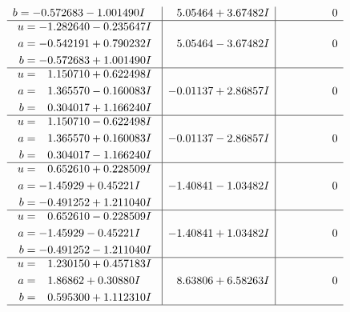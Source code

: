 \documentclass[1p]{elsarticle_modified}
\theoremstyle{definition}
\begin{document}
$$\begin{array}{c|c|c}
\begin{aligned}
b &= -0.572683 - 1.001490 I\end{aligned}
 & \phantom{-}5.05464 + 3.67482 I & \phantom{-0.000000 } 0 \\ \hline\begin{aligned}
u &= -1.282640 - 0.235647 I \\
a &= -0.542191 + 0.790232 I \\
b &= -0.572683 + 1.001490 I\end{aligned}
 & \phantom{-}5.05464 - 3.67482 I & \phantom{-0.000000 } 0 \\ \hline\begin{aligned}
u &= \phantom{-}1.150710 + 0.622498 I \\
a &= \phantom{-}1.365570 - 0.160083 I \\
b &= \phantom{-}0.304017 + 1.166240 I\end{aligned}
 & -0.01137 + 2.86857 I & \phantom{-0.000000 } 0 \\ \hline\begin{aligned}
u &= \phantom{-}1.150710 - 0.622498 I \\
a &= \phantom{-}1.365570 + 0.160083 I \\
b &= \phantom{-}0.304017 - 1.166240 I\end{aligned}
 & -0.01137 - 2.86857 I & \phantom{-0.000000 } 0 \\ \hline\begin{aligned}
u &= \phantom{-}0.652610 + 0.228509 I \\
a &= -1.45929 + 0.45221 I \\
b &= -0.491252 + 1.211040 I\end{aligned}
 & -1.40841 - 1.03482 I & \phantom{-0.000000 } 0 \\ \hline\begin{aligned}
u &= \phantom{-}0.652610 - 0.228509 I \\
a &= -1.45929 - 0.45221 I \\
b &= -0.491252 - 1.211040 I\end{aligned}
 & -1.40841 + 1.03482 I & \phantom{-0.000000 } 0 \\ \hline\begin{aligned}
u &= \phantom{-}1.230150 + 0.457183 I \\
a &= \phantom{-}1.86862 + 0.30880 I \\
b &= \phantom{-}0.595300 + 1.112310 I\end{aligned}
 & \phantom{-}8.63806 + 6.58263 I & \phantom{-0.000000 } 0\\
 \hline 
 \end{array}$$\newpage$$\begin{array}{c|c|c}  

\end{array}$$
\end{document}
